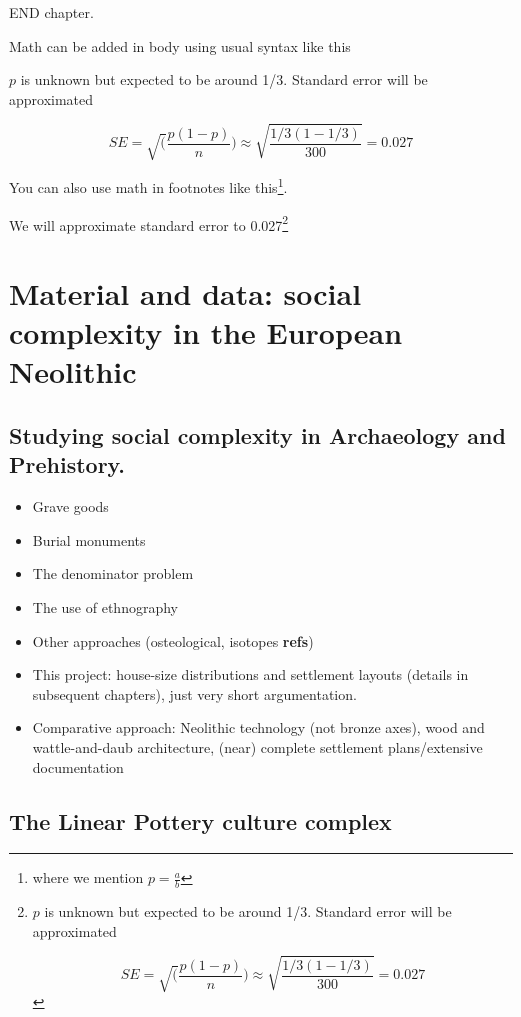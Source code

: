 \documentclass[
  12pt,
]{book}
\begin{document}
END chapter.

Math can be added in body using usual syntax like this

\(p\) is unknown but expected to be around 1/3. Standard error will be approximated

\[
SE = \sqrt(\frac{p(1-p)}{n}) \approx \sqrt{\frac{1/3 (1 - 1/3)} {300}} = 0.027
\]

You can also use math in footnotes like this\footnote{where we mention \(p = \frac{a}{b}\)}.

We will approximate standard error to 0.027\footnote{\(p\) is unknown but expected to be around 1/3. Standard error will be approximated

  \[
  SE = \sqrt(\frac{p(1-p)}{n}) \approx \sqrt{\frac{1/3 (1 - 1/3)} {300}} = 0.027
  \]}

\hypertarget{material}{%
\chapter{Material and data: social complexity in the European Neolithic}\label{material}}

\hypertarget{complexity-archaeo}{%
\section{Studying social complexity in Archaeology and Prehistory.}\label{complexity-archaeo}}

\begin{itemize}
\item
  Grave goods
\item
  Burial monuments
\item
  The denominator problem
\item
  The use of ethnography
\item
  Other approaches (osteological, isotopes \textbf{refs})
\item
  This project: house-size distributions and settlement layouts (details in subsequent chapters), just very short argumentation.
\item
  Comparative approach: Neolithic technology (not bronze axes), wood and wattle-and-daub architecture, (near) complete settlement plans/extensive documentation
\end{itemize}

\hypertarget{lbk}{%
\section{The Linear Pottery culture complex}\label{lbk}}
\end{document}

